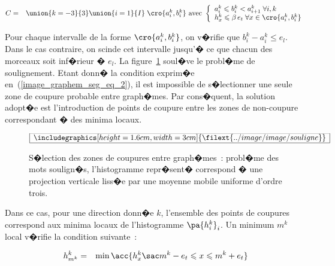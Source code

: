             \begin{eqnarray}
            C &=& \union{k=-3}{3} \union{i=1}{I} \; \cro{a_i^k, b_i^k} 
                                            \text{ avec } \left\{ \begin{array}{l}
                                                                a_i^k \leqslant b_i^k < a^k_{i+1} \; \forall i,k \\
                                                                h_x^k \leqslant \beta \, e_t \; \forall x \in \cro{a_i^k, b_i^k}
                                                                \end{array} \right.
            \label{image_graphem_seg_eq_2}
            \end{eqnarray}



Pour chaque intervalle de la forme $\cro{a_i^k, b_i^k}$, on v�rifie que $b_i^k - a_i^k \leqslant e_l$. Dans le cas contraire, on scinde cet intervalle jusqu'� ce que chacun des morceaux soit inf�rieur � $e_l$. La figure~\ref{image_graphem_zone_coupure_soulignement} soul�ve le probl�me de soulignement. Etant donn� la condition exprim�e en~(\ref{image_graphem_seg_eq_2}), il est impossible de s�lectionner une seule zone de coupure probable entre graph�mes. Par cons�quent, la solution adopt�e est l'introduction de points de coupure entre les zones de non-coupure correspondant � des minima locaux. 

            \begin{figure}[ht]
        $$\frame{$\begin{array}[c]{c}\includegraphics[height=1.6cm, width=3cm]
        {\filext{../image/image/souligne}}\end{array}$}$$
        \caption{    S�lection des zones de coupures entre graph�mes~: probl�me des mots soulign�s,
                            l'histogramme repr�sent� correspond � une projection verticale liss�e par une 
                            moyenne mobile uniforme d'ordre trois.}
        \label{image_graphem_zone_coupure_soulignement}
            \end{figure}
            
Dans ce cas, pour une direction donn�e $k$, l'ensemble des points de coupures correspond aux minima locaux de l'histogramme $\pa{h_i^k}_i$. Un minimum $m^k$ local v�rifie la condition suivante~:

            \begin{eqnarray}
            h^k_{m^k} &=& \min \acc{ h_x^k \sac  m^k - e_t \leqslant x \leqslant m^k + e_t } 
            \label{image_graphem_seg_eq_2_prime}
            \end{eqnarray}


